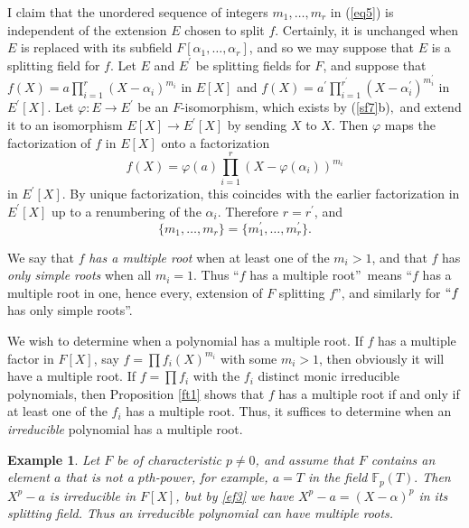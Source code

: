 \documentclass[a4paper,11pt,final,openany]{memoir}
\newtheorem{example}[X]{Example}
\theoremstyle{nonumberplain}
\begin{document}
I claim that the unordered sequence of integers $m_{1},\ldots,m_{r}$ in
(\ref{eq5}) is independent of the extension $E$ chosen to split $f$.
Certainly, it is unchanged when $E$ is replaced with its subfield
$F[\alpha_{1},\ldots,\alpha_{r}]$, and so we may suppose that $E$ is a
splitting field for $f$. Let $E$ and $E^{\prime}$ be splitting fields for $F$,
and suppose that $f(X)=a\prod_{i=1}^{r}(X-\alpha_{i})^{m_{i}}$ in $E[X]$ and
$f(X)=a^{\prime}\prod_{i=1}^{r^{\prime}}(X-\alpha_{i}^{\prime})^{m_{i}%
^{\prime}}$ in $E^{\prime}[X]$. Let $\varphi\colon E\rightarrow E^{\prime}$ be
an $F$-isomorphism, which exists by (\ref{sf7}b)$,$ and extend it to an
isomorphism $E[X]\rightarrow E^{\prime}[X]$ by sending $X$ to $X$. Then
$\varphi$ maps the factorization of $f$ in $E[X]$ onto a factorization%
\[
f(X)=\varphi(a)\prod_{i=1}^{r}(X-\varphi(\alpha_{i}))^{m_{i}}%
\]
in $E^{\prime}[X]$. By unique factorization, this coincides with the earlier
factorization in $E^{\prime}[X]$ up to a renumbering of the $\alpha_{i}$.
Therefore $r=r^{\prime}$, and%
\[
\{m_{1},\ldots,m_{r}\}=\{m_{1}^{\prime},\ldots,m_{r}^{\prime}\}.
\]


We say that $f$ \emph{has a multiple root} when at least one of the $m_{i}>1$,
and that $f$ has \emph{only simple roots} when all $m_{i}=1$. Thus
\textquotedblleft$f$ has a multiple root\textquotedblright\ means
\textquotedblleft$f$ has a multiple root in one, hence every, extension of $F$
splitting $f$\textquotedblright, and similarly for $``f$ has only simple
roots\textquotedblright.

We wish to determine when a polynomial has a multiple root. If $f$ has a
multiple factor in $F[X]$, say $f=\prod f_{i}(X)^{m_{i}}$ with some $m_{i}>1$,
then obviously it will have a multiple root. If $f=\prod f_{i}$ with the
$f_{i}$ distinct monic irreducible polynomials, then Proposition \ref{ft1}
shows that $f$ has a multiple root if and only if at least one of the $f_{i}$
has a multiple root. Thus, it suffices to determine when an
\textit{irreducible} polynomial has a multiple root.

\begin{example}
\label{ft2}Let $F$ be of characteristic $p\neq0$, and assume that $F$ contains
an element $a$ that is not a $p$th-power, for example, $a=T$ in the field
$\mathbb{F}{}_{p}(T).$ Then $X^{p}-a$ is irreducible in $F[X]$, but by
\ref{ef3} we have $X^{p}-a=(X-\alpha)^{p}$ in its splitting field. Thus an
irreducible polynomial can have multiple roots.
\end{example}
\end{document}
